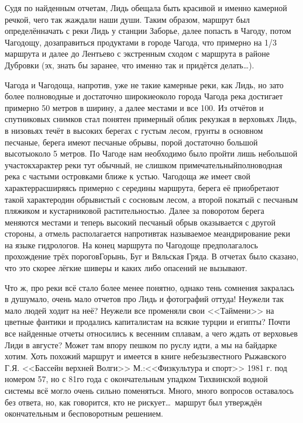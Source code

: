 Судя по найденным отчетам, Лидь обещала быть красивой и именно камерной речкой, чего так жаждали наши души. Таким образом, маршрут был определён\mdash начать с реки Лидь у станции Заборье, далее попасть в Чагоду, потом Чагодощу, дозаправиться продуктами в городе Чагода, что примерно на 1/3 маршрута и далее до Лентьево с экстренным сходом с маршрута в районе Дубровки (эх, знать бы заранее, что именно так и придётся делать\ldots).
 
Чагода и Чагодоща, напротив, уже не такие камерные реки, как Лидь, но зато более полноводные и достаточно широкие\mdash около города Чагода река достигает примерно 50 метров в ширину, а далее местами и все 100. Из отчётов и спутниковых снимков стал понятен примерный облик рек\mdash узкая в верховьях Лидь, в низовьях течёт в высоких берегах с густым лесом, грунты в основном песчаные, берега имеют песчаные обрывы, порой достаточно большой высоты\mdash около 5 метров. По Чагоде нам необходимо было пройти лишь небольшой участок\mdash характер реки тут обычный, не слишком примечательный\mdash полноводная река с частыми островками ближе к устью. Чагодоща же имеет свой характер\mdash расширяясь примерно с середины маршрута, берега её приобретают такой характер\mdash один обрывистый с сосновым лесом, а второй покатый с песчаным пляжиком и кустарниковой растительностью. Далее за поворотом берега меняются местами и теперь высокий песчаный обрыв оказывается с другой стороны, а отмель располагается напротив\mdash так называемое меандрирование реки на языке гидрологов. На конец маршрута по Чагодоще предполагалось прохождение трёх порогов\mdash Горынь, Буг и Вяльская Гряда. В отчетах было сказано, что это скорее лёгкие шиверы и каких либо опасений не вызывают. 

Что ж, про реки всё стало более менее понятно, однако тень сомнения закралась в душу\mdash мало, очень мало отчетов про Лидь и фотографий оттуда! Неужели так мало людей ходит на неё? Неужели все променяли свои <<Таймени>> на цветные фантики и продались капиталистам на всякие турции и египты? Почти все найденные отчеты относились к весенним сплавам, а чего ждать от верховьев Лиди в августе? Может там впору пешком по руслу идти, а мы на байдарке хотим. Хоть похожий маршрут и имеется в книге небезызвестного Рыжавского Г.Я. <<Бассейн верхней Волги>> М.:<<Физкультура и спорт>> 1981 г. под номером 57, но с 81\sdash го года с окончательным упадком Тихвинской водной системы всё могло очень сильно поменяться. Много, много вопросов оставалось без ответа, но, как говорится, кто не рискует\ldots~маршрут был утверждён окончательным и бесповоротным решением.

